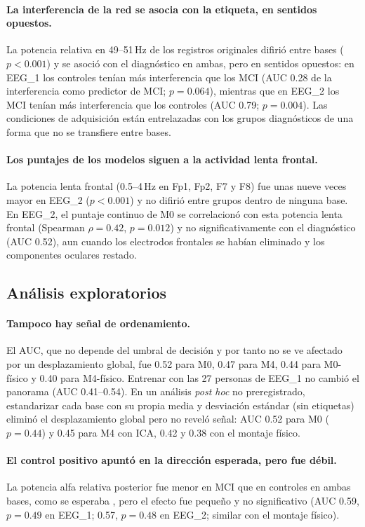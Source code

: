 \paragraph{La interferencia de la red se asocia con la etiqueta, en sentidos opuestos.} La potencia relativa en 49--51\,Hz de los registros originales difirió entre bases ($p<0.001$) y se asoció con el diagnóstico en ambas, pero en sentidos opuestos: en EEG\_1 los controles tenían más interferencia que los MCI (AUC 0.28 de la interferencia como predictor de MCI; $p=0.064$), mientras que en EEG\_2 los MCI tenían más interferencia que los controles (AUC 0.79; $p=0.004$). Las condiciones de adquisición están entrelazadas con los grupos diagnósticos de una forma que no se transfiere entre bases.

\paragraph{Los puntajes de los modelos siguen a la actividad lenta frontal.} La potencia lenta frontal (0.5--4\,Hz en Fp1, Fp2, F7 y F8) fue unas nueve veces mayor en EEG\_2 ($p<0.001$) y no difirió entre grupos dentro de ninguna base. En EEG\_2, el puntaje continuo de M0 se correlacionó con esta potencia lenta frontal (Spearman $\rho=0.42$, $p=0.012$) y no significativamente con el diagnóstico (AUC 0.52), aun cuando los electrodos frontales se habían eliminado y los componentes oculares restado.

\subsection{Análisis exploratorios}

\paragraph{Tampoco hay señal de ordenamiento.} El AUC, que no depende del umbral de decisión y por tanto no se ve afectado por un desplazamiento global, fue 0.52 para M0, 0.47 para M4, 0.44 para M0-físico y 0.40 para M4-físico. Entrenar con las 27 personas de EEG\_1 no cambió el panorama (AUC 0.41--0.54). En un análisis \emph{post hoc} no preregistrado, estandarizar cada base con su propia media y desviación estándar (sin etiquetas) eliminó el desplazamiento global pero no reveló señal: AUC 0.52 para M0 ($p=0.44$) y 0.45 para M4 con ICA, 0.42 y 0.38 con el montaje físico.

\paragraph{El control positivo apuntó en la dirección esperada, pero fue débil.} La potencia alfa relativa posterior fue menor en MCI que en controles en ambas bases, como se esperaba \citep{babiloni2015}, pero el efecto fue pequeño y no significativo (AUC 0.59, $p=0.49$ en EEG\_1; 0.57, $p=0.48$ en EEG\_2; similar con el montaje físico).

